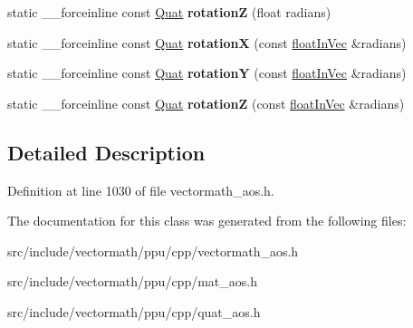 \begin{DoxyCompactItemize}
\item 
\hypertarget{classVectormath_1_1Aos_1_1Quat_a6af77f56f5c6619a5d495ef14f915a9e}{static \-\_\-\-\_\-forceinline const \hyperlink{classVectormath_1_1Aos_1_1Quat}{Quat} {\bfseries rotation\-Z} (float radians)}\label{classVectormath_1_1Aos_1_1Quat_a6af77f56f5c6619a5d495ef14f915a9e}

\item 
\hypertarget{classVectormath_1_1Aos_1_1Quat_ada95a0ba49cce541911b3c0a3d137f75}{static \-\_\-\-\_\-forceinline const \hyperlink{classVectormath_1_1Aos_1_1Quat}{Quat} {\bfseries rotation\-X} (const \hyperlink{classVectormath_1_1floatInVec}{float\-In\-Vec} \&radians)}\label{classVectormath_1_1Aos_1_1Quat_ada95a0ba49cce541911b3c0a3d137f75}

\item 
\hypertarget{classVectormath_1_1Aos_1_1Quat_a6be6de87610e3297322c3a4bcb4c4646}{static \-\_\-\-\_\-forceinline const \hyperlink{classVectormath_1_1Aos_1_1Quat}{Quat} {\bfseries rotation\-Y} (const \hyperlink{classVectormath_1_1floatInVec}{float\-In\-Vec} \&radians)}\label{classVectormath_1_1Aos_1_1Quat_a6be6de87610e3297322c3a4bcb4c4646}

\item 
\hypertarget{classVectormath_1_1Aos_1_1Quat_a851b48cbf39a05c5a1a3fefa83a92e39}{static \-\_\-\-\_\-forceinline const \hyperlink{classVectormath_1_1Aos_1_1Quat}{Quat} {\bfseries rotation\-Z} (const \hyperlink{classVectormath_1_1floatInVec}{float\-In\-Vec} \&radians)}\label{classVectormath_1_1Aos_1_1Quat_a851b48cbf39a05c5a1a3fefa83a92e39}

\end{DoxyCompactItemize}


\subsection{Detailed Description}


Definition at line 1030 of file vectormath\-\_\-aos.\-h.



The documentation for this class was generated from the following files\-:\begin{DoxyCompactItemize}
\item 
src/include/vectormath/ppu/cpp/vectormath\-\_\-aos.\-h\item 
src/include/vectormath/ppu/cpp/mat\-\_\-aos.\-h\item 
src/include/vectormath/ppu/cpp/quat\-\_\-aos.\-h\end{DoxyCompactItemize}
